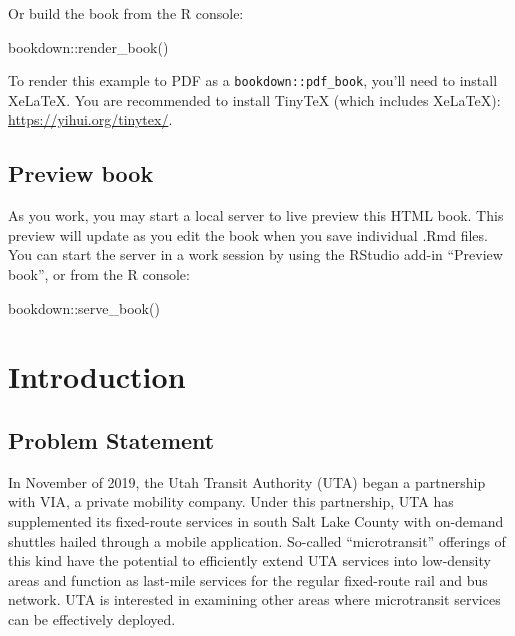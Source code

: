 \documentclass[
]{article}
\newenvironment{Shaded}{\begin{snugshade}}{\end{snugshade}}
\newcommand{\FunctionTok}[1]{\textcolor[rgb]{0.00,0.00,0.00}{#1}}
\newcommand{\NormalTok}[1]{#1}
\newcommand{\SpecialCharTok}[1]{\textcolor[rgb]{0.00,0.00,0.00}{#1}}
\begin{document}
Or build the book from the R console:

\begin{Shaded}
\begin{Highlighting}[]
\NormalTok{bookdown}\SpecialCharTok{::}\FunctionTok{render\_book}\NormalTok{()}
\end{Highlighting}
\end{Shaded}

To render this example to PDF as a \texttt{bookdown::pdf\_book}, you'll need to install XeLaTeX. You are recommended to install TinyTeX (which includes XeLaTeX): \url{https://yihui.org/tinytex/}.

\hypertarget{preview-book}{%
\subsection{Preview book}\label{preview-book}}

As you work, you may start a local server to live preview this HTML book. This preview will update as you edit the book when you save individual .Rmd files. You can start the server in a work session by using the RStudio add-in ``Preview book'', or from the R console:

\begin{Shaded}
\begin{Highlighting}[]
\NormalTok{bookdown}\SpecialCharTok{::}\FunctionTok{serve\_book}\NormalTok{()}
\end{Highlighting}
\end{Shaded}

\hypertarget{introduction}{%
\section{Introduction}\label{introduction}}

\hypertarget{problem-statement}{%
\subsection{Problem Statement}\label{problem-statement}}

In November of 2019, the Utah Transit Authority (UTA) began a partnership with VIA, a private mobility company. Under this partnership, UTA has supplemented its fixed-route services in south Salt Lake County with on-demand shuttles hailed through a mobile application. So-called ``microtransit'' offerings of this kind have the potential to efficiently extend UTA services into low-density areas and function as last-mile services for the regular fixed-route rail and bus network. UTA is interested in examining other areas where microtransit services can be effectively deployed.
\end{document}
